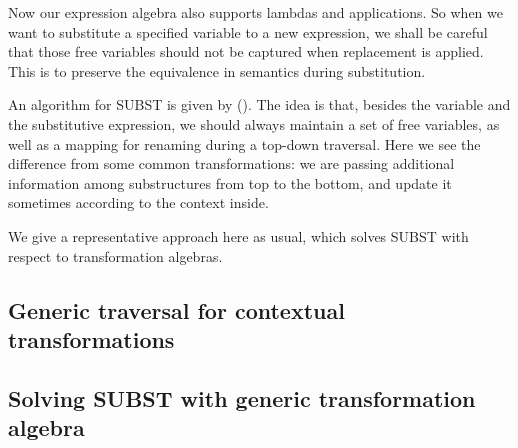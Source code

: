 Now our expression algebra also supports lambdas and applications. So when we want to substitute a specified variable to a new expression, we shall be careful that those free variables should not be captured when replacement is applied. This is to preserve the equivalence in semantics during substitution.

An algorithm for SUBST is given by (). The idea is that, besides the variable and the substitutive expression, we should always maintain a set of free variables, as well as a mapping for renaming during a top-down traversal. Here we see the difference from some common transformations: we are passing additional information among substructures from top to the bottom, and update it sometimes according to the context inside.

We give a representative approach here as usual, which solves SUBST with respect to transformation algebras.

\subsection{Generic traversal for contextual transformations}\label{subsec:genericcontexttrans}

\subsection{Solving SUBST with generic transformation algebra}\label{subsec:solvingsubst}
